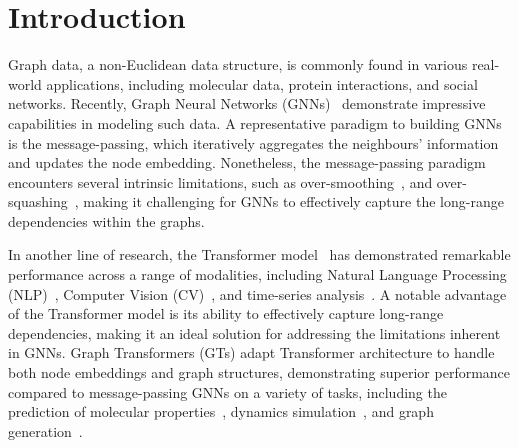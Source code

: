 \section{Introduction}






Graph data, a non-Euclidean data structure, is commonly found in various real-world applications, including molecular data, protein interactions, and social networks. Recently, Graph Neural Networks (GNNs)~\cite{kipf2016semi, liu2024segno} demonstrate impressive capabilities in modeling such data. A representative paradigm to building GNNs is the message-passing, which iteratively aggregates the neighbours' information and updates the node embedding. 
Nonetheless, the   message-passing paradigm encounters several intrinsic limitations, such as over-smoothing~\cite{DBLP:conf/iclr/RongHXH20},\cite{chen2020measuring} and over-squashing~\cite{kreuzer2021rethinking}, making it challenging for GNNs to effectively capture the long-range dependencies within the graphs. 

In another line of research, the Transformer model~\cite{vaswani2017attention} has demonstrated remarkable performance across a range of modalities, including Natural Language Processing (NLP)~\cite{vaswani2017attention}, Computer Vision (CV)~\cite{dosovitskiy2021an}, and time-series analysis~\cite{time-series-survey}. A notable advantage of the Transformer model is its ability to effectively capture long-range dependencies, making it an ideal solution for addressing the limitations inherent in GNNs. Graph Transformers (GTs) adapt Transformer architecture to handle both node embeddings and graph structures, demonstrating superior performance compared to message-passing GNNs on a variety of tasks, including the prediction of molecular properties~\cite{rong2020self, Graphormer, tholke2022torchmd}, dynamics simulation~\cite{fuchs2020se3transformers,liao2023equiformer, equiformer_v2}, and graph generation~\cite{vignac2023digress}.

